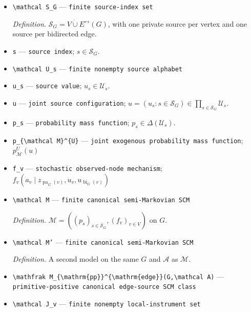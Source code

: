 \documentclass{article}
\begin{document}
\begin{itemize}
  \item \texttt{\textbackslash{}\allowbreak{}mathcal S\_\allowbreak{}G} --- \texttt{finite source-\allowbreak{}index set}
  \par\smallskip\noindent\emph{Definition.} \(\mathcal S_G=V\mathbin{\dot\cup}E^{\leftrightarrow}(G)\), with one private source per vertex and one source per bidirected edge.
  \item \texttt{s} --- \texttt{source index}; \(s\in\mathcal S_G\).
  \item \texttt{\textbackslash{}\allowbreak{}mathcal U\_\allowbreak{}s} --- \texttt{finite nonempty source alphabet}
  \item \texttt{u\_\allowbreak{}s} --- \texttt{source value}; \(u_s\in\mathcal U_s\).
  \item \texttt{u} --- \texttt{joint source configuration}; \(u=(u_s:s\in\mathcal S_G)\in\prod_{s\in\mathcal S_G}\mathcal U_s\).
  \item \texttt{p\_\allowbreak{}s} --- \texttt{probability mass function}; \(p_s\in\Delta(\mathcal U_s)\).
  \item \texttt{p\_\allowbreak{}\{\textbackslash{}\allowbreak{}mathcal M\}\allowbreak{}\textasciicircum{}\{U\}\allowbreak{}} --- \texttt{joint exogenous probability mass function}; \(p_{\mathcal M}^{U}(u)\)
  \item \texttt{f\_\allowbreak{}v} --- \texttt{stochastic observed-\allowbreak{}node mechanism}; \(f_v(a_v\mid z_{\operatorname{pa}_G(v)},u_v,u_{\operatorname{bi}_G(v)})\)
  \item \texttt{\textbackslash{}\allowbreak{}mathcal M} --- \texttt{finite canonical semi-\allowbreak{}Markovian SCM}
  \par\smallskip\noindent\emph{Definition.} \(\mathcal M=((p_s)_{s\in\mathcal S_G},(f_v)_{v\in V})\) on \(G\).
  \item \texttt{\textbackslash{}\allowbreak{}mathcal M'} --- \texttt{finite canonical semi-\allowbreak{}Markovian SCM}
  \par\smallskip\noindent\emph{Definition.} A second model on the same \(G\) and \(\mathcal A\) as \(\mathcal M\).
  \item \texttt{\textbackslash{}\allowbreak{}mathfrak M\_\allowbreak{}\{\textbackslash{}\allowbreak{}mathrm\{pp\}\allowbreak{}\}\allowbreak{}\textasciicircum{}\{\textbackslash{}\allowbreak{}mathrm\{edge\}\allowbreak{}\}\allowbreak{}(G,\allowbreak{}\textbackslash{}\allowbreak{}mathcal A)} --- \texttt{primitive-\allowbreak{}positive canonical edge-\allowbreak{}source SCM class}
  \item \texttt{\textbackslash{}\allowbreak{}mathcal J\_\allowbreak{}v} --- \texttt{finite nonempty local-\allowbreak{}instrument set}

\end{itemize}
\end{document}
